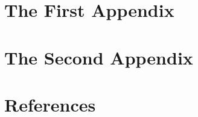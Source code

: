 \documentclass[print]{nuthesis}
\begin{document}
\appendix

\hypertarget{the-first-appendix}{%
\chapter{The First Appendix}\label{the-first-appendix}}

\hypertarget{the-second-appendix}{%
\chapter{The Second Appendix}\label{the-second-appendix}}

\backmatter

\hypertarget{references}{%
\chapter*{References}\label{references}}

\noindent

\setlength{\parindent}{-0.20in}
\setlength{\leftskip}{0.20in}
\setlength{\parskip}{8pt}
\end{document}
